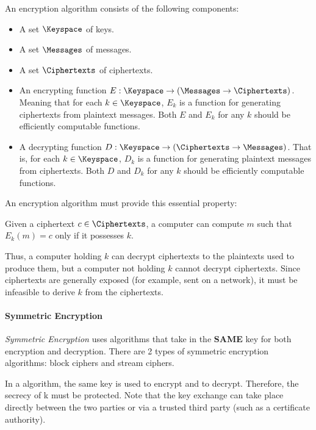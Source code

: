An encryption algorithm consists of the following components:
\begin{itemize}[noitemsep]
\item A set $\Keyspace$ of keys.
\item A set $\Messages$ of messages.
\item A set $\Ciphertexts$ of ciphertexts.
\item An encrypting function $E : \Keyspace \rightarrow (\Messages \rightarrow \Ciphertexts)$.
  Meaning that for each $k \in \Keyspace$, $E_{k}$ is a function for generating ciphertexts from plaintext messages.
  Both $E$ and $E_{k}$ for any $k$ should be efficiently computable functions.
\item A decrypting function $D : \Keyspace \rightarrow (\Ciphertexts \rightarrow \Messages)$.
  That is, for each $k \in \Keyspace$, $D_{k}$ is a function for generating plaintext messages from ciphertexts.
  Both $D$ and $D_{k}$ for any $k$ should be efficiently computable functions.
\end{itemize}

An encryption algorithm must provide this essential property:
\begin{blackbox}
Given a ciphertext $c \in \Ciphertexts$, a computer can compute $m$ such that $E_{k}(m) = c$ only if it possesses $k$.
\end{blackbox}

Thus, a computer holding $k$ can decrypt ciphertexts to the plaintexts used to produce them, but a computer not holding $k$ cannot decrypt ciphertexts.
Since ciphertexts are generally exposed (for example, sent on a network), it must be infeasible to derive $k$ from the ciphertexts.

\paragraph{Symmetric Encryption}\label{par:Symmetric_Encryption}
\begin{definition}\label{def:Symmetric_Encryption}
  \emph{Symmetric Encryption} uses algorithms that take in the \textbf{SAME} key for both encryption and decryption.
  There are 2 types of symmetric encryption algorithms: block ciphers and stream ciphers.
\end{definition}

In a  algorithm, the same key is used to encrypt and to decrypt.
Therefore, the secrecy of k must be protected.
Note that the key exchange can take place directly between the two parties or via a trusted third party (such as a certificate authority).


